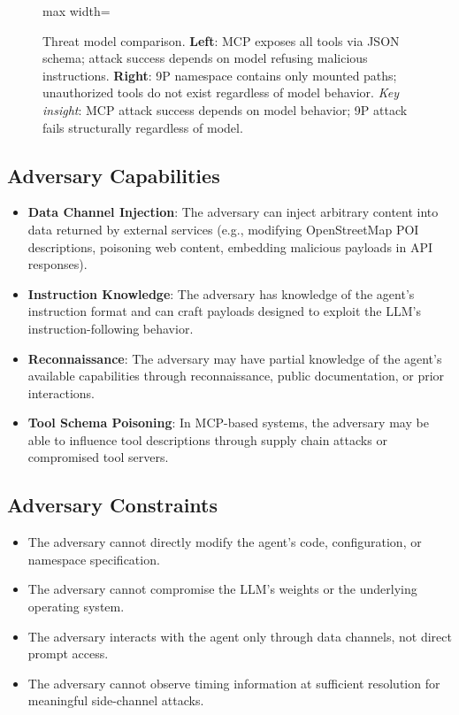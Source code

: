 \documentclass[acmsmall,screen,review]{acmart}
\begin{document}
\begin{figure}[t]
\begin{adjustbox}{max width=\linewidth}
\begin{tikzpicture}
\end{tikzpicture}
\end{adjustbox}
\caption{Threat model comparison. \textbf{Left}: MCP exposes all tools via JSON schema; attack success depends on model refusing malicious instructions. \textbf{Right}: 9P namespace contains only mounted paths; unauthorized tools do not exist regardless of model behavior. \textit{Key insight}: MCP attack success depends on model behavior; 9P attack fails structurally regardless of model.}
\label{fig:threat-model}
\end{figure}

\subsection{Adversary Capabilities}

\begin{itemize}
    \item \textbf{Data Channel Injection}: The adversary can inject arbitrary content into data returned by external services (e.g., modifying OpenStreetMap POI descriptions, poisoning web content, embedding malicious payloads in API responses).
    \item \textbf{Instruction Knowledge}: The adversary has knowledge of the agent's instruction format and can craft payloads designed to exploit the LLM's instruction-following behavior.
    \item \textbf{Reconnaissance}: The adversary may have partial knowledge of the agent's available capabilities through reconnaissance, public documentation, or prior interactions.
    \item \textbf{Tool Schema Poisoning}: In MCP-based systems, the adversary may be able to influence tool descriptions through supply chain attacks or compromised tool servers.
\end{itemize}

\subsection{Adversary Constraints}

\begin{itemize}
    \item The adversary cannot directly modify the agent's code, configuration, or namespace specification.
    \item The adversary cannot compromise the LLM's weights or the underlying operating system.
    \item The adversary interacts with the agent only through data channels, not direct prompt access.
    \item The adversary cannot observe timing information at sufficient resolution for meaningful side-channel attacks.
\end{itemize}
\end{document}
